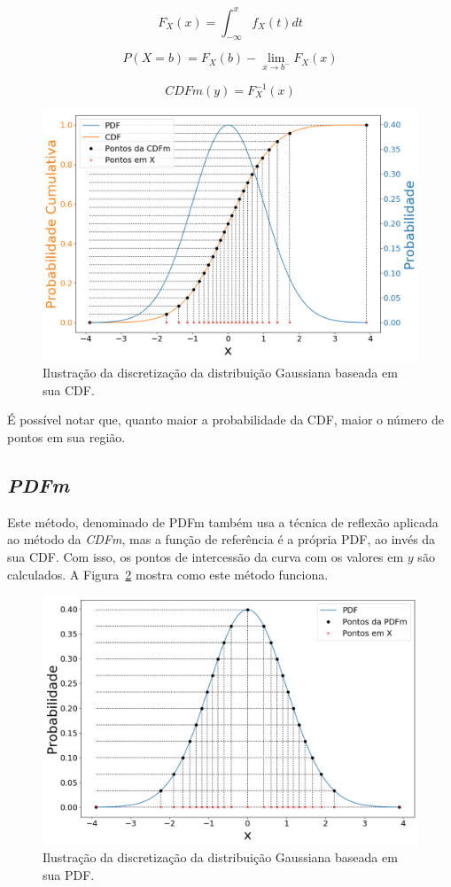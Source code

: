 \begin{equation}
\displaystyle F_X(x) = \int_{-\infty}^{x} f_X(t)dt
\label{equ:CDF}
\end{equation}

\begin{equation}
 {P} (X=b)=F_{X}(b)-\lim _{x\to b^{-}}F_{X}(x)
 \label{equ:CDF_disc}
\end{equation}

\begin{equation}
CDFm(y) = F^{-1}_X(x)
\label{equ:cdf_inv}
\end{equation}

\begin{figure}[H]
	\centering
	\includegraphics[width=0.6\linewidth]{./figuras/CDFm_normal_1}
	\caption{Ilustração da discretização da distribuição Gaussiana baseada em sua CDF.}
	\label{fig:CDFm_curve}
\end{figure}

É possível notar que, quanto maior a probabilidade da \ac{CDF}, maior o número de pontos em sua região.

\subsection{\textit{PDFm}}
Este método, denominado de \ac{PDFm} também usa a técnica de reflexão aplicada ao método da \textit{CDFm}, mas a função de referência é a própria \ac{PDF}, ao invés da sua \ac{CDF}. Com isso, os pontos de intercessão da curva com os valores em $ y $ são calculados. A Figura~\ref{fig:PDFm_curve} mostra como este método funciona. 

\begin{figure}[H]
	\centering
	\includegraphics[width=0.67\linewidth]{./figuras/PDFm_normal_1}
	\caption{Ilustração da discretização da distribuição Gaussiana baseada em sua PDF.}
	\label{fig:PDFm_curve}
\end{figure}


